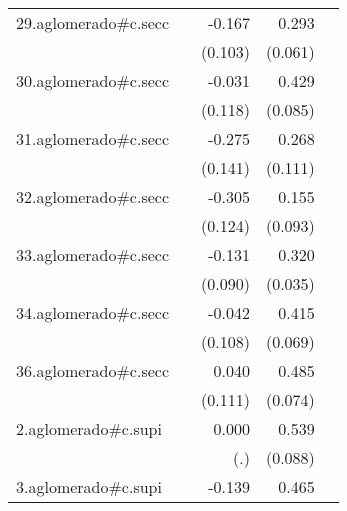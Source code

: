 {\begin{longtable}{l*{4}{D{.}{.}{-1}}}
\addlinespace
29.aglomerado#c.secc&                     &      -0.167         &       0.293\sym{***}&                     \\
            &                     &     (0.103)         &     (0.061)         &                     \\
\addlinespace
30.aglomerado#c.secc&                     &      -0.031         &       0.429\sym{***}&                     \\
            &                     &     (0.118)         &     (0.085)         &                     \\
\addlinespace
31.aglomerado#c.secc&                     &      -0.275         &       0.268\sym{*}  &                     \\
            &                     &     (0.141)         &     (0.111)         &                     \\
\addlinespace
32.aglomerado#c.secc&                     &      -0.305\sym{*}  &       0.155         &                     \\
            &                     &     (0.124)         &     (0.093)         &                     \\
\addlinespace
33.aglomerado#c.secc&                     &      -0.131         &       0.320\sym{***}&                     \\
            &                     &     (0.090)         &     (0.035)         &                     \\
\addlinespace
34.aglomerado#c.secc&                     &      -0.042         &       0.415\sym{***}&                     \\
            &                     &     (0.108)         &     (0.069)         &                     \\
\addlinespace
36.aglomerado#c.secc&                     &       0.040         &       0.485\sym{***}&                     \\
            &                     &     (0.111)         &     (0.074)         &                     \\
\addlinespace
2.aglomerado#c.supi&                     &       0.000         &       0.539\sym{***}&                     \\
            &                     &         (.)         &     (0.088)         &                     \\
\addlinespace
3.aglomerado#c.supi&                     &      -0.139         &       0.465\sym{***}&                     \\

\end{longtable}}
